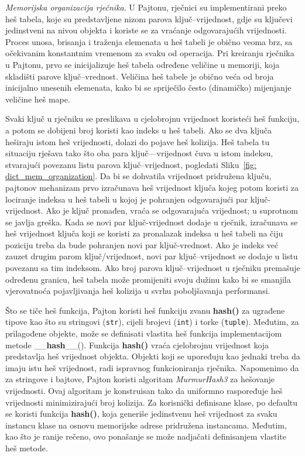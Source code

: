 \textit{Memorijska organizacija rječnika}.  U Pajtonu, rječnici su implementi\-rani preko heš tabela, koje su predstavljene nizom parova ključ--vrije\-dnost, gdje su ključevi jedinstveni na nivou objekta i koriste se za vraćanje odgovarajućih vrijednosti. Proces unosa, brisanja i traženja elemenata u heš tabeli je obično veoma brz, sa očekivanim konstantnim vremenom za svaku od operaci\-ja. Pri kreiranju rječnika u Pajtonu, prvo se inicijalizuje heš tabela određene veličine  u memoriji, koja skladišti parove ključ--vrednost. Veličina heš tabele je obično veća od broja inicijalno unesenih elemenata, kako bi se spriječilo često (dinamičko) mijenjanje veličine heš mape.
	
	Svaki ključ u rječniku se preslikava u cjelobrojnu vrijednost koristeći heš funkciju, a potom se dobijeni broj koristi kao indeks u heš tabeli. Ako se dva ključa heširaju istom heš vrijednosti, dolazi do pojave heš kolizija. Heš tabela tu situaciju rješava tako što oba para ključ---vrijednost čuva u istom indeksu, stvarajući povezanu listu parova ključ--vrijednost, pogledati Sliku~\ref{fig: dict_mem_organization}. Da bi se dohvatila vrijednost pridružena ključu, pajtonov mehani\-zam prvo izračunava heš vrijednost ključa kojeg potom koristi za lociranje indeksa u heš tabeli u kojoj je pohranjen odgovarajući par ključ-vrijednost. Ako je ključ pronađen, vraća se odgovarajuća vrijednost; u suprotnom se javlja greška.  Kada se novi par ključ-vrijednost dodaje u rječnik, izračunava se heš vrijednost ključa koji se koristi za pronalazak  indeksa u heš tabeli na čiju poziciju treba da bude pohranjen novi par ključ-vrednost. Ako je indeks već zauzet drugim parom ključ/vrijednost, novi par ključ--vrijednost se dodaje u   listu povezanu sa tim indeksom. Ako broj parova ključ--vrijednost u rječniku premašuje određenu granicu, heš tabela može promijeniti svoju dužinu kako bi se smanjila vjerova\-tnoća pojavljivanja heš kolizija u svrhu poboljšavanja performansi.
	
	Što se tiče heš funkcija, Pajton koristi heš funkciju zvanu \textbf{hash()} za ugrađene tipove kao što su stringovi (\texttt{str}), cijeli brojevi (\texttt{int}) i torke (\texttt{tuple}). Međutim, za prilagođene objekte, može se definisati vlastita heš funkcija implementacijom metode \_\_\textbf{hash}\_\_(). Funkcija \textbf{hash()}  vraća cjelobrojnu vrijednost koja predstavlja heš vrijednost objekta. Objekti koji se upoređuju kao jednaki treba da imaju istu heš vrijednost, radi ispravnog funkcioniranja rječnika. Napomenimo da za stringove i bajtove, Pajton koristi algoritam \textit{MurmurHash3} za hešovanje vrijednosti. Ovaj algoritam je konstruisan tako da uniformno raspoređuje heš vrijednosti minimizirajući broj kolizija. Za korisnički definisane klase, po defaultu se koristi funkcija \textbf{hash()}, koja generiše jedinstvenu heš vrijednost za svaku instancu klase na osnovu memorijske adrese pridružena instancama. Međutim, kao što je ranije rečeno, ovo pona\-šanje se može nadjačati definisanjem vlastite heš metode. 
	
